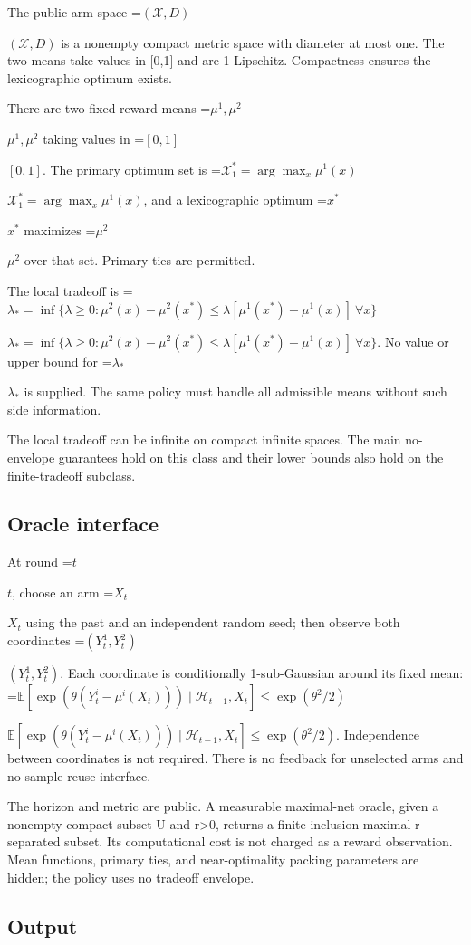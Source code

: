 \documentclass[10pt,a4paper]{article}
\newcommand{\AtlasMath}[1]{\par\begingroup\centering\setbox0=\hbox{$\displaystyle #1$}\ifdim\wd0>1.4\linewidth\typeout{ATLAS WIDE FORMULA: \the\wd0}\fi\ifdim\wd0>\linewidth\resizebox{\linewidth}{!}{\box0}\else\box0\fi\par\endgroup}
\newcommand{\AtlasInlineMath}[1]{\begingroup\setbox0=\hbox{$#1$}\ifdim\wd0>.4\linewidth\endgroup\AtlasMath{#1}\else\endgroup$#1$\fi}
\begin{document}
The public arm space \AtlasInlineMath{(\mathcal X,D)} is a nonempty compact metric space with diameter at most one. The two means take values in [0,1] and are 1-Lipschitz. Compactness ensures the lexicographic optimum exists.



There are two fixed reward means \AtlasInlineMath{\mu^1,\mu^2} taking values in \AtlasInlineMath{[0,1]}. The primary optimum set is \AtlasInlineMath{\mathcal X_1^*=\arg\max_x\mu^1(x)}, and a lexicographic optimum \AtlasInlineMath{x^*} maximizes \AtlasInlineMath{\mu^2} over that set. Primary ties are permitted.



The local tradeoff is \AtlasInlineMath{\lambda_* =\inf\{\lambda\ge0:\mu^2(x)-\mu^2(x^*)\le\lambda[\mu^1(x^*)-\mu^1(x)]\ \forall x\}}. No value or upper bound for \AtlasInlineMath{\lambda_*} is supplied. The same policy must handle all admissible means without such side information.



The local tradeoff can be infinite on compact infinite spaces. The main no-envelope guarantees hold on this class and their lower bounds also hold on the finite-tradeoff subclass.



\subsection{Oracle interface}


At round \AtlasInlineMath{t}, choose an arm \AtlasInlineMath{X_t} using the past and an independent random seed; then observe both coordinates \AtlasInlineMath{(Y_t^1,Y_t^2)}. Each coordinate is conditionally 1-sub-Gaussian around its fixed mean: \AtlasInlineMath{\mathbb E[\exp(\theta(Y_t^i-\mu^i(X_t)))\mid\mathcal H_{t-1},X_t]\le\exp(\theta^2/2)}. Independence between coordinates is not required. There is no feedback for unselected arms and no sample reuse interface.



The horizon and metric are public. A measurable maximal-net oracle, given a nonempty compact subset U and r>0, returns a finite inclusion-maximal r-separated subset. Its computational cost is not charged as a reward observation. Mean functions, primary ties, and near-optimality packing parameters are hidden; the policy uses no tradeoff envelope.



\subsection{Output}
\end{document}
